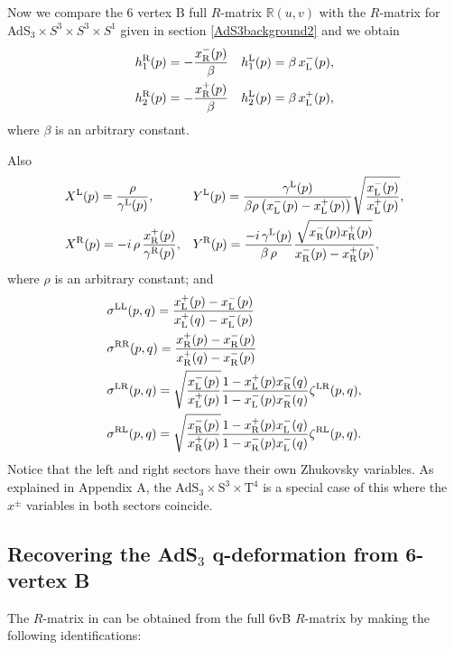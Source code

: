 \documentclass[12pt,a4paper]{article}
\numberwithin{equation}{section}
\newcommand{\bbR}{\mathbb{R}}
\begin{document}
Now we compare the 6 vertex B full $ R $-matrix $ \bbR(u,v) $ with the $ R $-matrix for AdS$ _3 \times S^3\times S^3 \times S^1$ \cite{Borsato:2015mma} given in section \ref{AdS3background2} and we obtain 
\begin{align}
& h_1^{{\rm R}}(p)=-\frac{x_{{\rm R}}^-(p)}{\beta} && h_1^{{\rm L}}(p)=\beta\, x_{{\rm L}}^-(p),\\
& h_2^{{\rm R}}(p)=-\frac{x_{{\rm R}}^+(p)}{\beta} && h_2^{{\rm L}}(p)=\beta\, x_{{\rm L}}^+(p),
\end{align}
where $ \beta $ is an arbitrary constant.

Also
%
\begin{align}
& X^{{\rm L}}(p)=\frac{\rho}{\gamma^{{\rm L}}(p)},&&
 Y^{{\rm L}}(p)=\frac{\gamma^{{\rm L}}(p)}{\beta\rho\left(x_{{\rm L}}^-(p)-x_{{\rm L}}^+(p)\right)}\sqrt{\frac{x_{{\rm L}}^-(p)}{x_{{\rm L}}^+(p)}},\\
& X^{{\rm R}}(p)=-i\,\rho\,\frac{ x_{{\rm R}}^+(p)}{\gamma^{{\rm R}}(p)},&&
Y^{{\rm R}}(p)=\frac{-i\,\gamma^{{\rm L}}(p)}{\beta\,\rho}\frac{\sqrt{x_{{\rm R}}^-(p)x_{{\rm R}}^+(p)}}{x_{{\rm R}}^-(p)-x_{{\rm R}}^+(p)},
\end{align}
%
where $ \rho $ is an arbitrary constant; and 
%
\begin{align}
& \sigma^{{\rm LL}}(p,q)=\frac{x_{{\rm L}}^+(p)-x_{{\rm L}}^-(p)}{x_{{\rm L}}^+(q)-x_{{\rm L}}^-(p)}\\ 
&\sigma^{{\rm RR}}(p,q)=\frac{x_{{\rm R}}^+(p)-x_{{\rm R}}^-(p)}{x_{{\rm R}}^+(q)-x_{{\rm R}}^-(p)}\\ 
&\sigma^{{\rm LR}}(p,q)=\sqrt{\frac{x_{{\rm L}}^-(p)}{x_{{\rm L}}^+(p)}}\frac{1-x_{{\rm L}}^+(p)x_{{\rm R}}^-(q)}{1-x_{{\rm L}}^-(p)x_{{\rm R}}^-(q)}\zeta^{{\rm LR}}(p,q),\\
& \sigma^{{\rm RL}}(p,q)=\sqrt{\frac{x_{{\rm R}}^-(p)}{x_{{\rm R}}^+(p)}}\frac{1-x_{{\rm R}}^+(p)x_{{\rm L}}^-(q)}{1-x_{{\rm R}}^-(p)x_{{\rm L}}^-(q)}\zeta^{{\rm RL}}(p,q).
\end{align}
Notice that the left and right sectors have their own Zhukovsky variables. As explained in Appendix A, the $\mathrm{AdS}_3\times \mathrm{S}^3 \times\mathrm{T}^4$ is a special case of this where the $x^\pm$ variables in both sectors coincide.

\subsection{Recovering the AdS$ _3 $ q-deformation from 6-vertex B}

The $R$-matrix in \cite{Hoare:2014oua,Seibold:2021lju} can be obtained from the full 6vB $ R $-matrix by making the following identifications:
\end{document}
